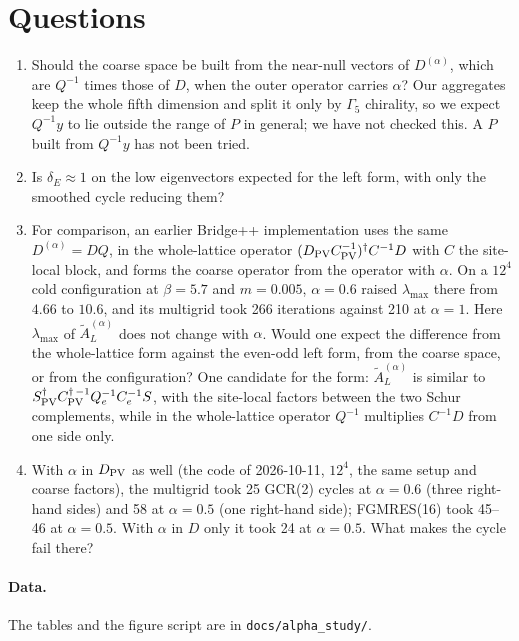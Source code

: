 \documentclass[11pt,a4paper]{article}
\newcommand{\Dpv}{D_{\mathrm{PV}}}
\newcommand{\AL}{\tilde A_{L}}
\newcommand{\dg}{^{\dagger}}
\begin{document}
\section{Questions}
\begin{enumerate}
\item Should the coarse space be built from the near-null vectors of $D^{(\alpha)}$, which are
$Q^{-1}$ times those of $D$, when the outer operator carries $\alpha$? Our aggregates keep
the whole fifth dimension and split it only by $\Gamma_5$ chirality, so we expect $Q^{-1}y$
to lie outside the range of $P$ in general; we have not checked this. A $P$ built from
$Q^{-1}y$ has not been tried.
\item Is $\delta_E\approx1$ on the low eigenvectors expected for the left form, with only the
smoothed cycle reducing them?
\item For comparison, an earlier Bridge++ implementation uses the same $D^{(\alpha)}=DQ$, in
the whole-lattice operator $(\Dpv C_{\rm PV}^{-1})\dg C^{-1}D$ with $C$ the site-local block,
and forms the coarse operator from the operator with $\alpha$. On a $12^4$ cold configuration
at $\beta=5.7$ and $m=0.005$, $\alpha=0.6$ raised $\lambda_{\max}$ there from $4.66$ to $10.6$,
and its multigrid took 266 iterations against 210 at $\alpha=1$. Here $\lambda_{\max}$ of
$\AL^{(\alpha)}$ does not change with $\alpha$. Would one expect the difference from the
whole-lattice form against the even-odd left form, from the coarse space, or from the
configuration? One candidate for the form: $\AL^{(\alpha)}$ is similar to
$S_{\rm PV}\dg C_{\rm PV}^{\dagger\,-1}Q_e^{-1}C_e^{-1}S$, with the site-local factors between
the two Schur complements, while in the whole-lattice operator $Q^{-1}$ multiplies $C^{-1}D$
from one side only.
\item With $\alpha$ in $D_{\rm PV}$ as well (the code of 2026-10-11, $12^4$, the same setup and
coarse factors), the multigrid took 25 GCR(2) cycles at $\alpha=0.6$ (three right-hand sides)
and 58 at $\alpha=0.5$ (one right-hand side); FGMRES(16) took 45--46 at $\alpha=0.5$. With
$\alpha$ in $D$ only it took 24 at $\alpha=0.5$. What makes the cycle fail there?
\end{enumerate}

\paragraph{Data.} The tables and the figure script are in \texttt{docs/alpha\_study/}.
\end{document}
